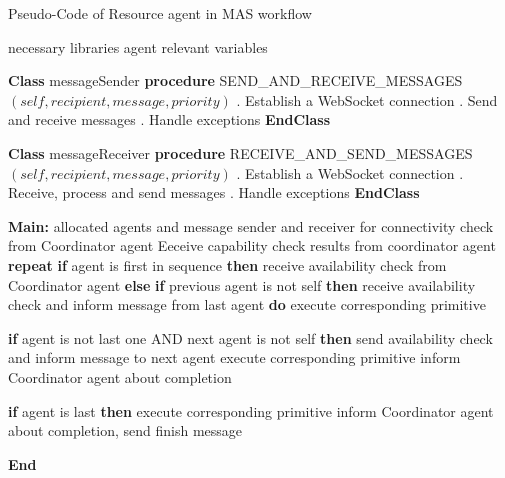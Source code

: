 \begin{algorithm}
    \caption{Pseudo-Code of Resource agent in MAS workflow}
    \label{alg:RAPseudoCode}
    \begin{algorithmic}
     necessary libraries
     agent relevant variables
    
    \State \textbf{Class} messageSender
    \State \textbf{\qquad procedure} {SEND\_AND\_RECEIVE\_MESSAGES$(self, recipient, message, priority)$}
    \State \qquad {}. Establish a WebSocket connection
    \State \qquad {}. Send and receive messages
    \State \qquad {}. Handle exceptions
\State \textbf{EndClass}

\State \textbf{Class} messageReceiver
    \State \textbf{\qquad procedure} {RECEIVE\_AND\_SEND\_MESSAGES$(self, recipient, message, priority)$}
    \State \qquad {}. Establish a WebSocket connection
    \State \qquad {}. Receive, process and send messages
    \State \qquad {}. Handle exceptions
\State \textbf{EndClass}
   
    \State \textbf{Main:}
     allocated agents and message sender and receiver
     for connectivity check from Coordinator agent
    \State {\qquad} Eeceive capability check results from coordinator agent
    \State \textbf{\qquad repeat}
    \State \textbf{\qquad \qquad if} {agent is first in sequence} \textbf{then}
         receive availability check from Coordinator agent
        \State \textbf{\qquad \qquad else}
        \State \textbf{\qquad \qquad \qquad if} {previous agent is not self} \textbf{then}
             receive availability check and inform message from last agent
            \State \textbf{\qquad \qquad \qquad do} execute corresponding primitive
        
            \State \textbf{\qquad \qquad \qquad if} {agent is not last one AND next agent is not self} \textbf{then}
            \State \textbf{\qquad \qquad \qquad \qquad} send availability check and inform message to next agent
            \State \textbf{\qquad \qquad \qquad \qquad} execute corresponding primitive
            \State \textbf{\qquad \qquad \qquad \qquad} inform Coordinator agent about completion
         
            \State \textbf{\qquad \qquad \qquad if} {agent is last} \textbf{then}
            \State \textbf{\qquad \qquad \qquad \qquad} execute corresponding primitive
            \State \textbf{\qquad \qquad \qquad \qquad} inform Coordinator agent about completion, send finish message
    
    \State \textbf{\qquad End} 
    \end{algorithmic}
    \end{algorithm}


